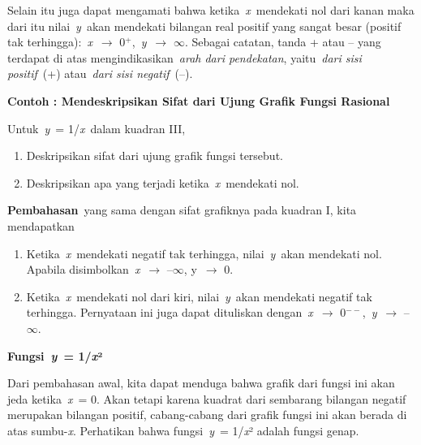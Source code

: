 \documentclass[11pt,fleqn]{book} %
\begin{document}
Selain itu juga dapat mengamati bahwa ketika~\textit{x}~mendekati nol dari kanan maka dari itu nilai~\textit{y}~akan mendekati bilangan real positif yang sangat besar (positif tak terhingga):~\textit{x}~$\mathrm{\to}$ 0${}^{+}$,~\textit{y}~$\mathrm{\to}$ $\mathrm{\infty}$. Sebagai catatan, tanda + atau -- yang terdapat di atas mengindikasikan~\textit{arah dari pendekatan}, yaitu~\textit{dari sisi positif}~(+) atau~\textit{dari sisi negatif}~(--).

\noindent \textbf{Contoh : Mendeskripsikan Sifat dari Ujung Grafik Fungsi Rasional}

\noindent Untuk~\textit{y}~= 1/\textit{x}~dalam kuadran III,

\begin{enumerate}
\item  Deskripsikan sifat dari ujung grafik fungsi tersebut.

\item  Deskripsikan apa yang terjadi ketika~\textit{x}~mendekati nol.
\end{enumerate}

\noindent \textbf{Pembahasan}~yang sama dengan sifat grafiknya pada kuadran I, kita mendapatkan

\begin{enumerate}
\item  Ketika~\textit{x}~mendekati negatif tak terhingga, nilai~\textit{y}~akan mendekati nol. Apabila disimbolkan~\textit{x}~$\mathrm{\to}$ --$\mathrm{\infty}$, y~$\mathrm{\to}$ 0.

\item  Ketika~\textit{x}~mendekati nol dari kiri, nilai~\textit{y}~akan mendekati negatif tak terhingga. Pernyataan ini juga dapat dituliskan dengan~\textit{x}~$\mathrm{\to}$ 0${}^{--}$,~\textit{y}~$\mathrm{\to}$ --$\mathrm{\infty}$.
\end{enumerate}

\noindent \textbf{Fungsi~\textit{y}~= 1/\textit{x}²}

\noindent Dari pembahasan awal, kita dapat menduga bahwa grafik dari fungsi ini akan jeda ketika~\textit{x}~= 0. Akan tetapi karena kuadrat dari sembarang bilangan negatif merupakan bilangan positif, cabang-cabang dari grafik fungsi ini akan berada di atas sumbu-\textit{x}. Perhatikan bahwa fungsi~\textit{y}~= 1/\textit{x}² adalah fungsi genap.
\end{document}
